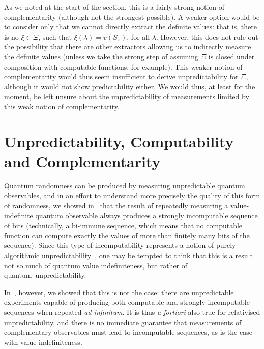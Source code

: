 \documentclass[information,article,accept,moreauthors,pdftex,12pt,a4paper]{mdpi}
\theoremstyle{mdpi}
\newcounter{thm}
\newcounter{ex}
\newcounter{re}
\theoremstyle{mdpidefinition}
\begin{document}
As we noted at the start of the section, this is a fairly strong notion of complementarity (although not the strongest possible).
A weaker option would be to consider only that we cannot directly extract the definite values: that is, there is no $\xi\in\Xi$, such that $\xi(\lambda)=v(S_x)$, for all $\lambda$.
However, this does not rule out the possibility that there are other extractors allowing us to indirectly measure the definite values (unless we take the strong step of assuming $\Xi$ is closed under composition with computable functions, for example).
This weaker notion of complementarity would thus seem insufficient to derive unpredictability for $\Xi$, although it would not show predictability either.
We would thus, at least for the moment, be left unsure about the unpredictability of measurements limited by this weak notion of complementarity.

\section{Unpredictability, Computability and Complementarity}

Quantum randomness can be produced by measuring unpredictable quantum observables, and in an effort to understand more precisely the quality of this
form of randomness, we showed in~\cite{2012-incomput-proofsCJ} that the result of repeatedly measuring a value-indefinite quantum observable always produces a strongly incomputable sequence of bits (technically, a bi-immune sequence, which means that no computable function can compute exactly the values of more than finitely many bits of the sequence).
Since this type of incomputability represents a notion of purely algorithmic unpredictability~\cite{DBLP:conf/birthday/AbbottCS15}, one may be tempted to think that this is a result not so much of quantum value indefiniteness, but rather of \mbox{quantum unpredictability.}

In~\cite{DBLP:conf/birthday/AbbottCS15}, however, we showed that this is not the case: there are unpredictable experiments capable of producing both computable and strongly incomputable sequences when repeated \emph{ad infinitum}. \linebreak
It is thus \emph{a fortiori} also true for relativised unpredictability, and there is no immediate guarantee that measurements of complementary observables must lead to incomputable sequences, as is the case with value indefiniteness.
\end{document}
